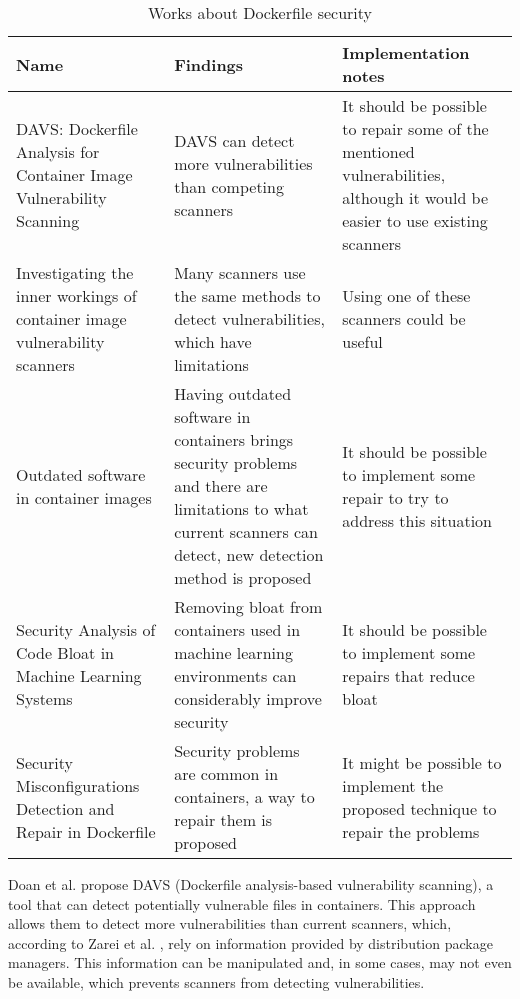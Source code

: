 \begin{table}[H]
    \centering
    \begin{tabular}{|p{}|p{}|p{}|}
        \hline \textbf{Name} & \textbf{Findings} & \textbf{Implementation notes} \\
        \hline DAVS: Dockerfile Analysis for Container Image Vulnerability Scanning \cite{doanDAVSDockerfileAnalysis2022} & DAVS can detect more vulnerabilities than competing scanners & It should be possible to repair some of the mentioned vulnerabilities, although it would be easier to use existing scanners \\
        \hline Investigating the inner workings of container image vulnerability scanners \cite{zareiInvestigatingInnerWorkings2022} & Many scanners use the same methods to detect vulnerabilities, which have limitations & Using one of these scanners could be useful \\
        \hline Outdated software in container images \cite{linnalampiOutdatedSoftwareContainer2021} & Having outdated software in containers brings security problems and there are limitations to what current scanners can detect, new detection method is proposed & It should be possible to implement some repair to try to address this situation \\
        \hline Security Analysis of Code Bloat in Machine Learning Systems \cite{ahmedSecurityAnalysisCode2022} & Removing bloat from containers used in machine learning environments can considerably improve security & It should be possible to implement some repairs that reduce bloat \\
        \hline Security Misconfigurations Detection and Repair in Dockerfile \cite{prinettoSecurityMisconfigurationsDetection} & Security problems are common in containers, a way to repair them is proposed & It might be possible to implement the proposed technique to repair the problems \\
        \hline
    \end{tabular} 
    \caption{Works about Dockerfile security}
    \label{tab:works_dockerfile_security}
\end{table}

Doan et al. \cite{doanDAVSDockerfileAnalysis2022} propose DAVS (Dockerfile analysis-based vulnerability scanning), a tool that can detect potentially vulnerable files in containers. This approach allows them to detect more vulnerabilities than current scanners, which, according to Zarei et al. \cite{zareiInvestigatingInnerWorkings2022}, rely on information provided by distribution package managers. This information can be manipulated and, in some cases, may not even be available, which prevents scanners from detecting vulnerabilities.

